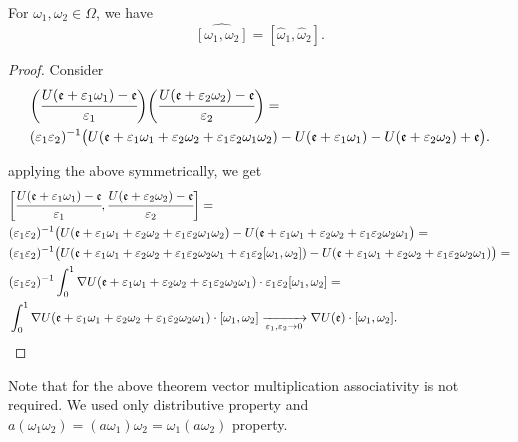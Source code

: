 \documentclass[main.tex]{subfiles}
\begin{document}
\begin{theorem}
\label{general-lie-transition}
For $\omega_1, \omega_2\in \Omega$, we have 
\begin{equation}
\widehat{[\omega_1, \omega_2]} = [\hat{\omega}_1, \hat{\omega}_2].
\end{equation}
\end{theorem}
\begin{proof}
Consider
\begin{align*}
& \bigg(\cfrac{U(\mathfrak{e} + \epsilon_1 \omega_1) - \mathfrak{e}}{\epsilon_1}\bigg)
\bigg(\cfrac{U(\mathfrak{e} + \epsilon_2 \omega_2) - \mathfrak{e}}{\epsilon_2}\bigg) = \\
& (\epsilon_1\epsilon_2)^{-1}\big(
U(\mathfrak{e} + \epsilon_1\omega_1 + \epsilon_2\omega_2 + \epsilon_1\epsilon_2 \omega_1\omega_2)
- U(\mathfrak{e} + \epsilon_1 \omega_1) - U(\mathfrak{e} + \epsilon_2 \omega_2) + \mathfrak{e}
\big).
\end{align*}

applying the above symmetrically, we get
\begin{align*}
& \bigg[\cfrac{U(\mathfrak{e} + \epsilon_1 \omega_1) - \mathfrak{e}}{\epsilon_1},
\cfrac{U(\mathfrak{e} + \epsilon_2 \omega_2) - \mathfrak{e}}{\epsilon_2}\bigg] = \\
& (\epsilon_1\epsilon_2)^{-1} \big(
U(\mathfrak{e} + \epsilon_1\omega_1 + \epsilon_2\omega_2 + \epsilon_1\epsilon_2 \omega_1\omega_2)
- U(\mathfrak{e} + \epsilon_1\omega_1 + \epsilon_2\omega_2 + \epsilon_1\epsilon_2 \omega_2\omega_1\big) = \\
& (\epsilon_1\epsilon_2)^{-1} \big(
U(\mathfrak{e} + \epsilon_1\omega_1 + \epsilon_2\omega_2 + \epsilon_1\epsilon_2 \omega_2\omega_1 + \epsilon_1\epsilon_2[\omega_1, \omega_2])
- U(\mathfrak{e} + \epsilon_1\omega_1 + \epsilon_2\omega_2 + \epsilon_1\epsilon_2 \omega_2\omega_1)\big) = \\
& (\epsilon_1\epsilon_2)^{-1} \int_0^1 \nabla U(\mathfrak{e} + \epsilon_1\omega_1 + \epsilon_2\omega_2 + \epsilon_1\epsilon_2 \omega_2\omega_1) \cdot \epsilon_1\epsilon_2[\omega_1, \omega_2] = \\ 
& \int_0^1 \nabla U(\mathfrak{e} + \epsilon_1\omega_1 + \epsilon_2\omega_2 + \epsilon_1\epsilon_2 \omega_2\omega_1) \cdot [\omega_1, \omega_2] \xrightarrow[\epsilon_1, \epsilon_2 \to 0]{} 
\nabla U(\mathfrak{e}) \cdot [\omega_1, \omega_2].
\end{align*}
\end{proof}

Note that for the above theorem vector multiplication associativity is not required. We used only distributive property and $a (\omega_1\omega_2) = (a\omega_1)\omega_2 = \omega_1(a\omega_2)$ property.
\end{document}

